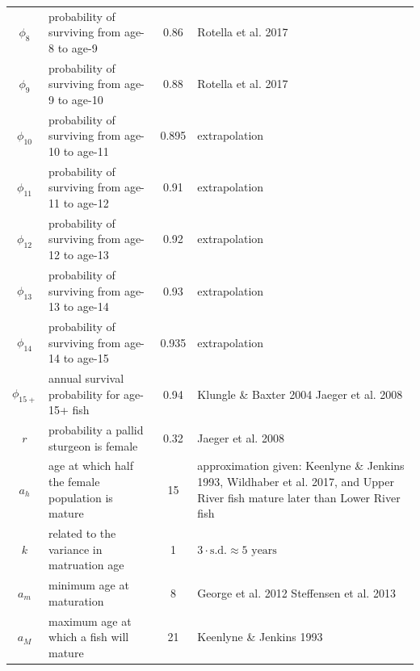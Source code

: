 \documentclass[12pt]{article}
\begin{document}
\begin{longtable}{cp{5.5cm}cp{5cm}}
$\phi_8$ & probability of surviving from age-8 to age-9 \newline & 0.86 & Rotella et al. 2017\\
$\phi_9$ & probability of surviving from age-9 to age-10 \newline & 0.88 & Rotella et al. 2017\\
$\phi_{10}$ & probability of surviving from age-10 to age-11 \newline & 0.895 & extrapolation\\
$\phi_{11}$ & probability of surviving from age-11 to age-12 \newline & 0.91 & extrapolation\\
$\phi_{12}$ & probability of surviving from age-12 to age-13 \newline & 0.92 & extrapolation\\
$\phi_{13}$ & probability of surviving from age-13 to age-14 \newline & 0.93 & extrapolation\\
$\phi_{14}$ & probability of surviving from age-14 to age-15 \newline & 0.935 & extrapolation\\
$\phi_{15+}$ & annual survival probability for age-15+ fish \newline & 0.94 & Klungle \& Baxter 2004 \newline Jaeger et al. 2008\\
$r$ & probability a pallid sturgeon is female \newline & 0.32 & Jaeger et al. 2008\\
$a_h$ & age at which half the female population is mature \newline & 15 & approximation given: \newline Keenlyne \& Jenkins 1993, \newline Wildhaber et al. 2017, and \newline Upper River fish mature later than Lower River fish\newline\\
$k$ & related to the variance in matruation age \newline & 1 & $3\cdot\mbox{s.d.}\approx5\mbox{ years}$\\
$a_m$ & minimum age at maturation \newline & 8 &  George et al. 2012 \newline Steffensen et al. 2013\newline \\
$a_M$ & maximum age at which a fish will mature \newline & 21 & Keenlyne \& Jenkins 1993\\

\end{longtable}
\end{document}
